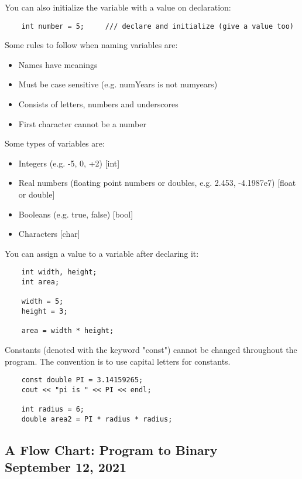 \documentclass[]{article}
\begin{document}
You can also initialize the variable with a value on declaration:
\begin{lstlisting}	
	int number = 5;     /// declare and initialize (give a value too)
\end{lstlisting}
\bigbreak

Some rules to follow when naming variables are:
\begin{itemize}
	\item Names have meanings
	\item Must be case sensitive (e.g. numYears is not numyears)
	\item Consists of letters, numbers and underscores
	\item First character cannot be a number
\end{itemize}
\bigbreak

Some types of variables are:
\begin{itemize}
	\item Integers (e.g. -5, 0, +2) [int]
	\item Real numbers (floating point numbers or doubles, e.g. 2.453, -4.1987e7) [float or double]
	\item Booleans (e.g. true, false) [bool]
	\item Characters [char]
\end{itemize}	    
\bigbreak
    
You can assign a value to a variable after declaring it:
\begin{lstlisting}	
	int width, height;
	int area;
	
	width = 5;
	height = 3;
	
	area = width * height;
\end{lstlisting}
\bigbreak

Constants (denoted with the keyword "const") cannot be changed throughout the program. The convention is to use capital letters for constants.
\begin{lstlisting}	
	const double PI = 3.14159265;
	cout << "pi is " << PI << endl;
	
	int radius = 6;
	double area2 = PI * radius * radius;
\end{lstlisting}
\bigbreak

\subsection{A Flow Chart: Program to Binary\\ {\large \normalfont September 12, 2021}}
\bigbreak
\end{document}
